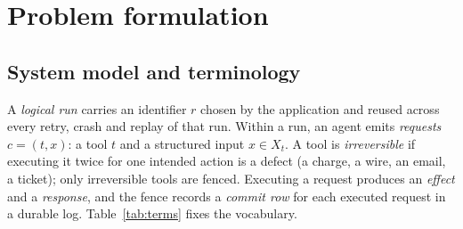 \section{Problem formulation}\label{sec:problem}

\subsection{System model and terminology}\label{sec:terms}

A \emph{logical run} carries an identifier $r$ chosen by the application and reused across every retry, crash and replay of that run. Within a run, an agent emits \emph{requests} $c=(t,x)$: a tool $t$ and a structured input $x\in X_t$. A tool is \emph{irreversible} if executing it twice for one intended action is a defect (a charge, a wire, an email, a ticket); only irreversible tools are fenced. Executing a request produces an \emph{effect} and a \emph{response}, and the fence records a \emph{commit row} for each executed request in a durable log. Table~\ref{tab:terms} fixes the vocabulary.


